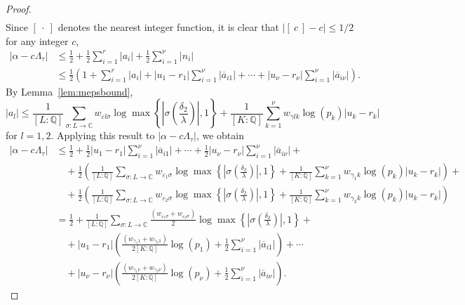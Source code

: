 \begin{proof}
\begin{align*}
\end{align*}
Since $[ \ \cdot \ ]$ denotes the nearest integer function, it is clear that $|[ \ c \ ] - c| \leq 1/2$ for any integer $c$, 
\begin{align*}
|\alpha-c\Lambda_\tau|
	& \leq \frac{1}{2} + \frac{1}{2}\sum_{i = 1}^r |a_i| + \frac{1}{2}\sum_{i = 1}^{\nu} |n_i|\\
	& \leq \frac{1}{2}\left(1 + \sum_{i = 1}^r |a_i| + |u_1-r_1|\sum_{i=1}^{\nu}|\overline{a}_{i1}| + \cdots + |u_{\nu} - r_{\nu}| \sum_{i=1}^{\nu}|\overline{a}_{i\nu}|\right).
\end{align*}
By Lemma~\ref{lem:mepsbound}, 
\[|a_l| \leq \frac{1}{[L:\mathbb{Q}]}\sum_{\sigma :L \to \mathbb{C}} w_{\varepsilon l \sigma}\log \max \left\{ \left|\sigma\left(\frac{\delta_2}{\lambda}\right)\right|, 1\right\} + \frac{1}{[K:\mathbb{Q}]}\sum_{k = 1}^{\nu} w_{\gamma l k}\log(p_k)|u_k - r_k|\]
for $l = 1,2$. Applying this result to $|\alpha-c\Lambda_\tau|$, we obtain
\begin{align*}
|\alpha-c\Lambda_\tau| 
	& \leq \frac{1}{2} + \frac{1}{2}|u_1-r_1|\sum_{i=1}^{\nu}|\overline{a}_{i1}| + \cdots + \frac{1}{2}|u_{\nu} - r_{\nu}| \sum_{i=1}^{\nu}|\overline{a}_{i\nu}| + \\
	& \quad + \frac{1}{2}\left(\frac{1}{[L:\mathbb{Q}]}\sum_{\sigma :L \to \mathbb{C}} w_{\varepsilon_1 \sigma}\log \max \left\{ \left|\sigma\left(\frac{\delta_2}{\lambda}\right)\right|, 1\right\} + \frac{1}{[K:\mathbb{Q}]}\sum_{k = 1}^{\nu} w_{\gamma_1 k}\log(p_k)|u_k - r_k| \right) + \\
	&\quad + \frac{1}{2}\left(\frac{1}{[L:\mathbb{Q}]}\sum_{\sigma :L \to \mathbb{C}} w_{\varepsilon_2 \sigma}\log \max \left\{ \left|\sigma\left(\frac{\delta_2}{\lambda}\right)\right|, 1\right\} + \frac{1}{[K:\mathbb{Q}]}\sum_{k = 1}^{\nu} w_{\gamma_2 k}\log(p_k)|u_k - r_k| \right) \\
	& = \frac{1}{2} + \frac{1}{[L:\mathbb{Q}]}\sum_{\sigma :L \to \mathbb{C}} \frac{(w_{\varepsilon_1 \sigma} + w_{\varepsilon_2 \sigma})}{2}\log \max \left\{ \left|\sigma\left(\frac{\delta_2}{\lambda}\right)\right|, 1\right\} + \\
	& \quad + |u_1 - r_1|\left( \frac{(w_{\gamma_1 1} + w_{\gamma_2 1})}{2[K:\mathbb{Q}]}\log(p_1) + \frac{1}{2}\sum_{i=1}^{\nu}|\overline{a}_{i1}|\right) + \cdots \\
	& \quad + |u_{\nu} - r_{\nu}|\left( \frac{(w_{\gamma_1 {\nu}} + w_{\gamma_2 {\nu}})}{2[K:\mathbb{Q}]}\log(p_{\nu}) + \frac{1}{2}\sum_{i=1}^{\nu}|\overline{a}_{i{\nu}}|\right). 
\end{align*}

\end{proof}
